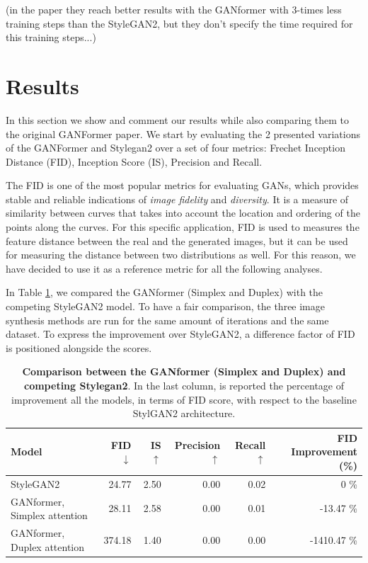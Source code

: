 \documentclass{article}
\begin{document}
	(in the paper they reach better results with the GANformer with 3-times less training steps than the 
	StyleGAN2, but they don't specify the time required for this training steps...)

	\section{Results}%
	In this section we show and comment our results while also comparing them to the original GANFormer paper.
	We start by evaluating the 2 presented variations of the GANFormer and Stylegan2 over a set of 
	four metrics: Frechet Inception Distance (FID), Inception Score (IS), Precision and Recall.
	
	The FID is one of the most popular metrics for evaluating GANs, which provides stable and reliable 
	indications of \textit{image fidelity} and \textit{diversity}. 
	It is a measure of similarity between curves that takes into account the location and ordering of the 
	points along the curves. 
	For this specific application, FID is used to measures the feature distance between the real and the 
	generated images, but it can be used for measuring the distance between two distributions as well.
	For this reason, we have decided to use it as a reference metric for all the following analyses.
	
	In Table \ref{tab:our-results}, we compared the GANformer (Simplex and Duplex) with the competing 
	StyleGAN2 model. To have a fair comparison, the three image synthesis methods are run for the 
	same amount of iterations and the same dataset.
	To express the improvement over StyleGAN2, a difference factor of FID is positioned alongside the 
	scores.
	\begin{table}[htb]
    	\centering
		\caption{\textbf{Comparison between the GANformer (Simplex and Duplex) and competing 
		Stylegan2}. In the last column, is reported the percentage of improvement all the models, in terms 
		of FID score, with respect to the baseline StylGAN2 architecture.}
		\label{tab:our-results}
		\vspace{3mm}
		\small
		\begin{tabular}{l|rrrrr}
			\toprule
			Model                        & FID $\downarrow$  & IS $\uparrow$& Precision$\uparrow$  & Recall 
			$\uparrow$& FID Improvement (\%)\\ 
			\midrule
			StyleGAN2                    &  24.77 & 2.50 & 0.00 & 0.02 & 0 \%\\ 
			GANformer, Simplex attention & 28.11 & 2.58 & 0.00 & 0.01 & -13.47 \%\\ 
			GANformer, Duplex attention  & 374.18 & 1.40 & 0.00 & 0.00 & -1410.47 \% \\ 
			\bottomrule
		\end{tabular}
	\end{table}
	
\end{document}
